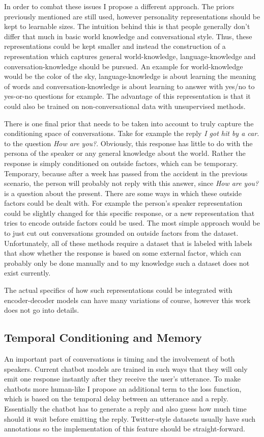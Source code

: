 \documentclass[12pt]{article}
\begin{document}
In order to combat these issues I propose a different approach. The priors previously mentioned are still used, however personality representations should be kept to learnable sizes. The intuition behind this is that people generally don't differ that much in basic world knowledge and conversational style. Thus, these representations could be kept smaller and instead the construction of a representation which captures general world-knowledge, language-knowledge and conversation-knowledge should be pursued. An example for world-knowledge would be the color of the sky, language-knowledge is about learning the meaning of words and conversation-knowledge is about learning to answer with yes/no to yes-or-no questions for example. The advantage of this representation is that it could also be trained on non-conversational data with unsupervised methods.

There is one final prior that needs to be taken into account to truly capture the conditioning space of conversations. Take for example the reply \textit{I got hit by a car.} to the question \textit{How are you?}. Obviously, this response has little to do with the persona of the speaker or any general knowledge about the world. Rather the response is simply conditioned on outside factors, which can be temporary. Temporary, because after a week has passed from the accident in the previous scenario, the person will probably not reply with this answer, since \textit{How are you?} is a question about the present. There are some ways in which these outside factors could be dealt with. For example the person's speaker representation could be slightly changed for this specific response, or a new representation that tries to encode outside factors could be used. The most simple approach would be to just cut out conversations grounded on outside factors from the dataset. Unfortunately, all of these methods require a dataset that is labeled with labels that show whether the response is based on some external factor, which can probably only be done manually and to my knowledge such a dataset does not exist currently.

The actual specifics of how such representations could be integrated with encoder-decoder models can have many variations of course, however this work does not go into details.

\subsection{Temporal Conditioning and Memory} \label{ssec:62}
An important part of conversations is timing and the involvement of both speakers. Current chatbot models are trained in such ways that they will only emit one response instantly after they receive the user's utterance. To make chatbots more human-like I propose an additional term to the loss function, which is based on the temporal delay between an utterance and a reply. Essentially the chatbot has to generate a reply and also guess how much time should it wait before emitting the reply. Twitter-style datasets usually have such annotations so the implementation of this feature should be straight-forward. 
\end{document}
